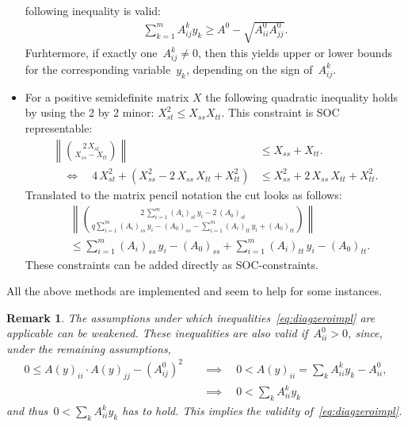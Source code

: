 \documentclass[10pt, a4paper]{article}
\newtheorem{remark}[theorem]{Remark}
\begin{document}
\begin{itemize}
  following inequality is valid:
  \begin{align}\label{eq:2minorprodD}
    \sum_{k=1}^m A^k_{ij} y_k \geq A^0 - \sqrt{A^0_{ii}A^0_{jj}}.
  \end{align}
  Furhtermore, if exactly one~$A^k_{ij} \neq 0$, then this yields upper or
  lower bounds for the corresponding variable~$y_k$, depending on the sign
  of~$A^k_{ij}$.
\item For a positive semidefinite matrix $X$ the following quadratic
  inequality holds by using the 2 by 2 minor:
  $X_{st}^2 \leq X_{ss} X_{tt}$. This constraint is SOC representable:
  \begin{align*}
    \left\|\binom{2\,X_{st}}{X_{ss} - X_{tt}}\right\| &\leq X_{ss} +
                                                        X_{tt}. \\
    \quad\Leftrightarrow\quad 4\, X_{st}^2 + (X_{ss}^2 - 2\,X_{ss}\, X_{tt}
    + X_{tt}^2) & \leq X_{ss}^2 + 2\, X_{ss}\,X_{tt} + X_{tt}^2.
  \end{align*}
  Translated to the matrix pencil notation the cut looks as follows:
  \begin{equation}\label{eq:2minorSOC}
    \begin{aligned}
      &\left\|\binom{2\, \sum_{i=1}^m (A_i)_{st}\, y_i - 2\, (A_0)_{st}}{ q
          \sum_{i=1}^m (A_i)_{ss}\, y_i - (A_0)_{ss} - \sum_{i=1}^m
          (A_i)_{tt}\, y_i + (A_0)_{tt}}\right\| \\ &\leq \sum_{i=1}^m
      (A_i)_{ss}\, y_i - (A_0)_{ss} + \sum_{i=1}^m (A_i)_{tt}\, y_i -
      (A_0)_{tt}.
    \end{aligned}
  \end{equation}
  These constraints can be added directly as SOC-constraints.
\end{itemize}

All the above methods are implemented and seem to help for some
instances.

\begin{remark}
  The assumptions under which inequalities~\eqref{eq:diagzeroimpl} are
  applicable can be weakened. These inequalities are also valid
  if~$A^0_{ii} > 0$, since, under the remaining assumptions,
  \begin{align*}
    0 \leq A(y)_{ii} \cdot A(y)_{jj} - (A^0_{ij})^2 \quad &\implies \quad
    0 < A(y)_{ii} = \sum_{k} A^k_{ii}y_k - A^0_{ii}, \\
    &\implies \quad 0 < \sum_{k} A^k_{ii}y_k
  \end{align*}
  and thus~$0 < \sum_{k} A^k_{ii}y_k$ has to hold. This implies the
  validity of~\eqref{eq:diagzeroimpl}.
\end{remark}
\end{document}
